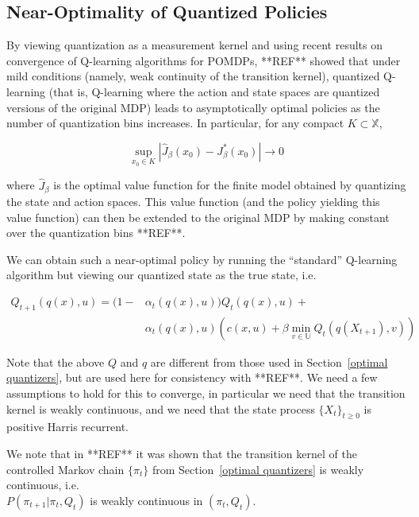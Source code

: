 \documentclass{article}
\begin{document}
\subsection{Near-Optimality of Quantized Policies}
By viewing quantization as a measurement kernel and using recent results on convergence of Q-learning algorithms for POMDPs, **REF** showed that under mild conditions (namely, weak continuity of the transition kernel), quantized Q-learning (that is, Q-learning where the action and state spaces are quantized versions of the original MDP) leads to asymptotically optimal policies as the number of quantization bins increases. In particular, for any compact \( K \subset \mathbb{X} \),

\[ \sup_{x_0 \in K}|\hat{J}_{\beta}(x_0) - J_{\beta}^*(x_0)| \to 0 \]

where \( \hat{J}_{\beta} \) is the optimal value function for the finite model obtained by quantizing the state and action spaces. This value function (and the policy yielding this value function) can then be extended to the original MDP by making constant over the quantization bins **REF**.

We can obtain such a near-optimal policy by running the ``standard'' Q-learning algorithm but viewing our quantized state as the true state, i.e.

\begin{equation}
    \begin{split}
        Q_{t+1}(q(x),u) = (1- & \alpha_t(q(x),u))Q_t(q(x),u) + \\
        & \alpha_t(q(x),u)(c(x,u)+\beta \; \underset{v\in\mathbb{U}}{\text{min}} \; Q_t(q(X_{t+1}),v))
    \end{split}
\end{equation}

Note that the above \( Q \) and \( q \) are different from those used in Section~\ref{optimal quantizers}, but are used here for consistency with **REF**. We need a few assumptions to hold for this to converge, in particular we need that the transition kernel is weakly continuous, and we need that the state process \( \{X_t\}_{t\ge0} \) is positive Harris recurrent. %

We note that in **REF** it was shown that the transition kernel of the controlled Markov chain \( \{\pi_t\} \) from Section~\ref{optimal quantizers} is weakly continuous, i.e. \\ \( P(\pi_{t+1} | \pi_t, Q_t) \) is weakly continuous in \( (\pi_t, Q_t) \).
\end{document}
